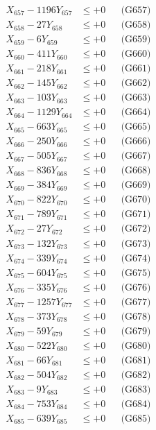 \documentclass[a4paper,10pt]{article}
\begin{document}
{\begin{align}
X_{657} - 1196Y_{657} &\leq +0 && \text{(G657)} \\
X_{658} - 27Y_{658} &\leq +0 && \text{(G658)} \\
X_{659} - 6Y_{659} &\leq +0 && \text{(G659)} \\
X_{660} - 411Y_{660} &\leq +0 && \text{(G660)} \\
\allowbreak
X_{661} - 218Y_{661} &\leq +0 && \text{(G661)} \\
X_{662} - 145Y_{662} &\leq +0 && \text{(G662)} \\
X_{663} - 103Y_{663} &\leq +0 && \text{(G663)} \\
X_{664} - 1129Y_{664} &\leq +0 && \text{(G664)} \\
X_{665} - 663Y_{665} &\leq +0 && \text{(G665)} \\
X_{666} - 250Y_{666} &\leq +0 && \text{(G666)} \\
X_{667} - 505Y_{667} &\leq +0 && \text{(G667)} \\
X_{668} - 836Y_{668} &\leq +0 && \text{(G668)} \\
X_{669} - 384Y_{669} &\leq +0 && \text{(G669)} \\
X_{670} - 822Y_{670} &\leq +0 && \text{(G670)} \\
\allowbreak
X_{671} - 789Y_{671} &\leq +0 && \text{(G671)} \\
X_{672} - 27Y_{672} &\leq +0 && \text{(G672)} \\
X_{673} - 132Y_{673} &\leq +0 && \text{(G673)} \\
X_{674} - 339Y_{674} &\leq +0 && \text{(G674)} \\
X_{675} - 604Y_{675} &\leq +0 && \text{(G675)} \\
X_{676} - 335Y_{676} &\leq +0 && \text{(G676)} \\
X_{677} - 1257Y_{677} &\leq +0 && \text{(G677)} \\
X_{678} - 373Y_{678} &\leq +0 && \text{(G678)} \\
X_{679} - 59Y_{679} &\leq +0 && \text{(G679)} \\
X_{680} - 522Y_{680} &\leq +0 && \text{(G680)} \\
\allowbreak
X_{681} - 66Y_{681} &\leq +0 && \text{(G681)} \\
X_{682} - 504Y_{682} &\leq +0 && \text{(G682)} \\
X_{683} - 9Y_{683} &\leq +0 && \text{(G683)} \\
X_{684} - 753Y_{684} &\leq +0 && \text{(G684)} \\
X_{685} - 639Y_{685} &\leq +0 && \text{(G685)} \\

\end{align}}
\end{document}
